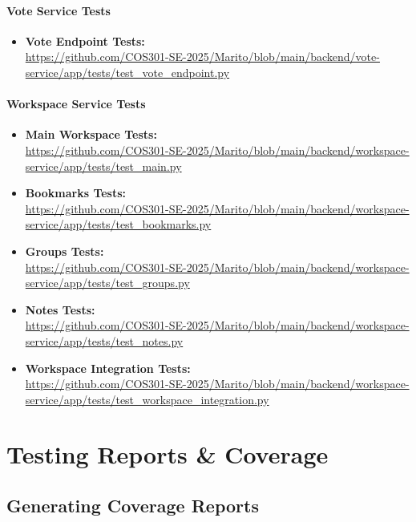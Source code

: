 \documentclass[12pt,a4paper]{article}
\begin{document}
\paragraph{Vote Service Tests}
\begin{itemize}
    \item \textbf{Vote Endpoint Tests:} \\
    \url{https://github.com/COS301-SE-2025/Marito/blob/main/backend/vote-service/app/tests/test_vote_endpoint.py}
\end{itemize}

\paragraph{Workspace Service Tests}
\begin{itemize}
    \item \textbf{Main Workspace Tests:} \\
    \url{https://github.com/COS301-SE-2025/Marito/blob/main/backend/workspace-service/app/tests/test_main.py}
    
    \item \textbf{Bookmarks Tests:} \\
    \url{https://github.com/COS301-SE-2025/Marito/blob/main/backend/workspace-service/app/tests/test_bookmarks.py}
    
    \item \textbf{Groups Tests:} \\
    \url{https://github.com/COS301-SE-2025/Marito/blob/main/backend/workspace-service/app/tests/test_groups.py}
    
    \item \textbf{Notes Tests:} \\
    \url{https://github.com/COS301-SE-2025/Marito/blob/main/backend/workspace-service/app/tests/test_notes.py}
    
    \item \textbf{Workspace Integration Tests:} \\
    \url{https://github.com/COS301-SE-2025/Marito/blob/main/backend/workspace-service/app/tests/test_workspace_integration.py}
\end{itemize}

\section{Testing Reports \& Coverage}

\subsection{Generating Coverage Reports}
\end{document}
